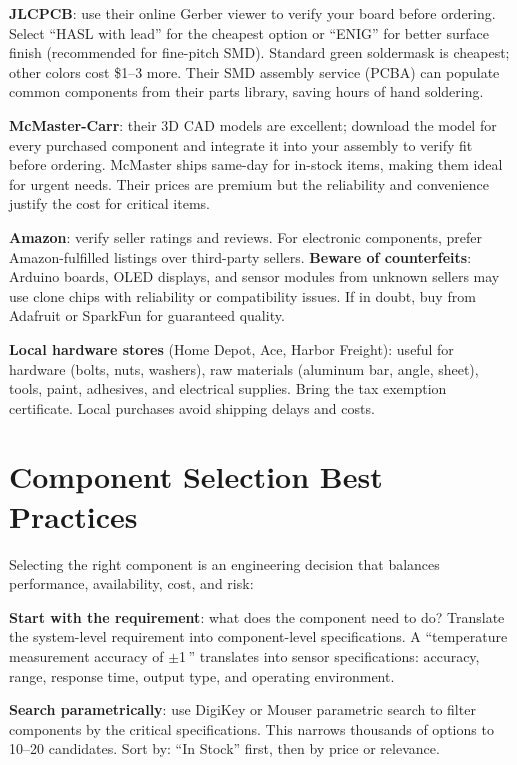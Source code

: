 \textbf{JLCPCB}: use their online Gerber viewer to verify your board before ordering. Select ``HASL with lead'' for the cheapest option or ``ENIG'' for better surface finish (recommended for fine-pitch SMD). Standard green soldermask is cheapest; other colors cost \$1--3 more. Their SMD assembly service (PCBA) can populate common components from their parts library, saving hours of hand soldering.

\textbf{McMaster-Carr}: their 3D CAD models are excellent; download the model for every purchased component and integrate it into your assembly to verify fit before ordering. McMaster ships same-day for in-stock items, making them ideal for urgent needs. Their prices are premium but the reliability and convenience justify the cost for critical items.

\textbf{Amazon}: verify seller ratings and reviews. For electronic components, prefer Amazon-fulfilled listings over third-party sellers. \textbf{Beware of counterfeits}: Arduino boards, OLED displays, and sensor modules from unknown sellers may use clone chips with reliability or compatibility issues. If in doubt, buy from Adafruit or SparkFun for guaranteed quality.

\textbf{Local hardware stores} (Home Depot, Ace, Harbor Freight): useful for hardware (bolts, nuts, washers), raw materials (aluminum bar, angle, sheet), tools, paint, adhesives, and electrical supplies. Bring the tax exemption certificate. Local purchases avoid shipping delays and costs.



\section{Component Selection Best Practices}
Selecting the right component is an engineering decision that balances performance, availability, cost, and risk:

\textbf{Start with the requirement}: what does the component need to do? Translate the system-level requirement into component-level specifications. A ``temperature measurement accuracy of $\pm$1\,\degC{}'' translates into sensor specifications: accuracy, range, response time, output type, and operating environment.

\textbf{Search parametrically}: use DigiKey or Mouser parametric search to filter components by the critical specifications. This narrows thousands of options to 10--20 candidates. Sort by: ``In Stock'' first, then by price or relevance.

